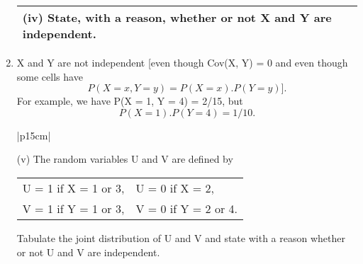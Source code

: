 \documentclass[a4paper,12pt]{article}
\begin{document}
\begin{enumerate}
\begin{table}[ht!]
 
\centering
 
\begin{tabular}{|p{15cm}|}
 
\hline

\noindent

(iv) State, with a reason, whether or not X and Y are independent.
\\ \hline
  
\end{tabular}

\end{table}


\item  X and Y are not independent [even though Cov(X, Y) = 0 and even though some cells have 
\[P(X = x, Y = y) = P(X = x).P(Y = y)].\] 
For example, we have P(X = 1, Y = 4) = 2/15, but 
\[P(X = 1).P(Y = 4) = 1/10.\]


\begin{table}[ht!]
 
\centering
 
\begin{tabular}{|p{15cm}|}
 
\hline

\noindent

(v) The random variables U and V are defined by
\begin{center}
\begin{tabular}{ll}
U = 1 if X = 1 or 3,& U = 0 if X = 2,\\
V = 1 if Y = 1 or 3,& V = 0 if Y = 2 or 4.\\
\end{tabular}
\end{center}
Tabulate the joint distribution of U and V and state with a reason whether or not U and V are independent.

\\ \hline
  
\end{tabular}

\end{table}



\end{enumerate}
\end{document}
